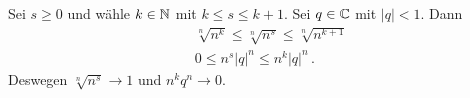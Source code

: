\begin{Bsp} Sei $s\geq 0$ und w\"ahle $k\in \mathbb{N}$ mit $k\leq s\leq k+1$.
Sei $q\in \mathbb{C}$ mit $|q|<1$. Dann 
\begin{eqnarray*}
&&\sqrt[n]{n^k}\leq \sqrt[n]{n^s}\leq \sqrt[n]{n^{k+1}}\\
&& 0\leq n^s|q|^n \leq n^k |q|^n\, .
\end{eqnarray*}
Deswegen $\sqrt[n]{n^s} \to 1$ und $n^k q^n \to 0$.
\end{Bsp}

